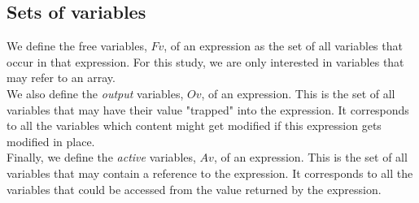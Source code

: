 \documentclass[12pt,a4paper]{article}
\begin{document}
\subsection{Sets of variables}


We define the free variables, $Fv$, of an expression as the set of all variables that occur in that expression. For this study, we are only interested in variables that may refer to an array.\\

We also define the \emph{output} variables, $Ov$, of an expression. This is the set of all variables that may have their value "trapped" into the expression. It corresponds to all the variables which content might get modified if this expression gets modified in place.\\

Finally, we define the \emph{active} variables, $Av$, of an expression. This is the set of all variables that may contain a reference to the expression. It corresponds to all the variables that could be accessed from the value returned by the expression.
\end{document}
